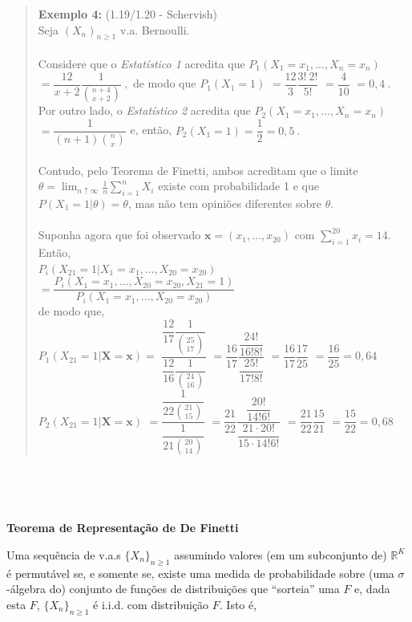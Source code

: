 \documentclass[
]{book}
\begin{document}
\begin{quote}
\textbf{Exemplo 4:} (1.19/1.20 - Schervish)\\
Seja \(\left(X_n\right)_{n\geq 1}\) v.a. Bernoulli.\\
\(~\)\\
Considere que o \emph{Estatístico 1} acredita que \(P_1(X_1=x_1,\ldots,X_n=x_n)\) \(=\dfrac{12}{x+2}\dfrac{1}{\binom{n+4}{x+2}}~,\) de modo que \(P_1(X_1=1)\) \(=\dfrac{12}{3}\dfrac{3!~2!}{5!}\) \(=\dfrac{4}{10}\) \(=0,4~.\)\\
Por outro lado, o \emph{Estatístico 2} acredita que \(P_2(X_1=x_1,\ldots,X_n=x_n)\) \(=\dfrac{1}{(n+1)\binom{n}{x}}\) e, então, \(P_2(X_1=1)=\dfrac{1}{2}=0,5~.\)\\
\(~\)\\
Contudo, pelo Teorema de Finetti, ambos acreditam que o limite \(\theta=\displaystyle\lim_{n\uparrow\infty}\frac{1}{n}\sum_{i=1}^nX_i\) existe com probabilidade 1 e que \(P(X_1=1|\theta)=\theta\), mas não tem opiniões diferentes sobre \(\theta\).\\
\(~\)\\
Suponha agora que foi observado \(\boldsymbol{x}=(x_1,\ldots,x_{20})\) com \(\displaystyle\sum_{i=1}^{20}x_i=14\). Então,\\
\(P_i(X_{21}=1|X_1=x_1,\ldots,X_{20}=x_{20})\) \(=\dfrac{P_i(X_1=x_1,\ldots,X_{20}=x_{20},X_{21}=1)}{P_i(X_1=x_1,\ldots,X_{20}=x_{20})}\)\\
de modo que,\\
\(P_1(X_{21}=1|\mathbf X=\mathbf x)=\) \(\dfrac{\dfrac{12}{17}\dfrac{1}{\binom{25}{17}}}{\dfrac{12}{16}\dfrac{1}{\binom{24}{16}}}\) \(=\dfrac{16}{17}\dfrac{\dfrac{24!}{16!8!}}{\dfrac{25!}{17!8!}}\) \(=\dfrac{16}{17}\dfrac{17}{25}\) \(=\dfrac{16}{25}=0,64\)\\
\(P_2(X_{21}=1|\mathbf X=\mathbf x)\) \(=\dfrac{\dfrac{1}{22\binom{21}{15}}}{\dfrac{1}{21\binom{20}{14}}}\) \(=\dfrac{21}{22}\dfrac{\dfrac{20!}{14!6!}}{\dfrac{21\cdot20!}{15\cdot 14!6!}}\) \(=\dfrac{21}{22}\dfrac{15}{21}\) \(=\dfrac{15}{22}=0,68\)
\end{quote}

\(~\)

\(~\)

\textbf{Teorema de Representação de De Finetti}

Uma sequência de v.a.s \(\{X_n\}_{n\geq 1}\) assumindo valores (em um subconjunto de) \(\mathbb R^K\) é permutável se, e somente se, existe uma medida de probabilidade sobre (uma \(\sigma\)-álgebra do) conjunto de funções de distribuições que ``sorteia'' uma \(F\) e, dada esta \(F\), \(\{X_n\}_{n\geq 1}\) é i.i.d. com distribuição \(F\). Isto é,
\end{document}
